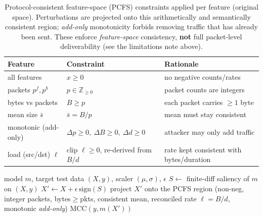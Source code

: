 \documentclass[preprint,12pt,authoryear]{elsarticle}
\begin{document}
\begin{table}[h]
\centering
\caption{Protocol-consistent feature-space (PCFS) constraints applied per feature
(original space). Perturbations are projected onto this arithmetically and
semantically consistent region; \emph{add-only} monotonicity forbids removing
traffic that has already been sent. These enforce \emph{feature-space} consistency,
\textbf{not} full packet-level deliverability (see the limitations note above).}
\label{tab:constraint}
\small
\begin{tabular}{lll}
\toprule
Feature & Constraint & Rationale \\
\midrule
all features            & $x \ge 0$                         & no negative counts/rates \\
packets $p^{f},p^{b}$   & $p \in \mathbb{Z}_{\ge 0}$        & packet counts are integers \\
bytes vs packets        & $B \ge p$                         & each packet carries $\ge 1$ byte \\
mean size $\bar{s}$     & $\bar{s} = B / p$                 & mean must stay consistent \\
monotonic (add-only)    & $\Delta p \ge 0,\ \Delta B \ge 0,\ \Delta d \ge 0$ & attacker may only add traffic \\
load (src/dst) $\ell$   & clip $\ell \ge 0$, re-derived from $B/d$ & rate kept consistent with bytes/duration \\
\bottomrule
\end{tabular}
\end{table}

\begin{algorithm}[h]
\caption{\emph{Adaptive PCFS (protocol-consistent feature-space) evasion} evaluation}
\label{alg:adv}
\begin{algorithmic}[1]
\Require model $m$, target test data $(X,y)$, scaler $(\mu,\sigma)$, $\epsilon$
\State $S \gets$ finite-diff saliency of $m$ on $(X,y)$
\State $X' \gets X + \epsilon\,\mathrm{sign}(S)$
\State project $X'$ onto the PCFS region (non-neg, integer packets, bytes$\ge$pkts,
consistent mean, reconciled rate $\ell=B/d$, monotonic \emph{add-only})
\State \Return $\mathrm{MCC}(y, m(X'))$
\end{algorithmic}
\end{algorithm}
\end{document}
